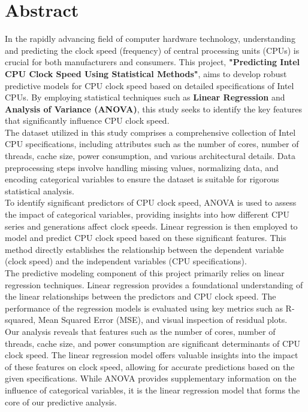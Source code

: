 \section{Abstract}

In the rapidly advancing field of computer hardware technology, understanding and predicting the clock speed (frequency) of central processing units (CPUs) is crucial for both manufacturers and consumers. This project, \textbf{"Predicting Intel CPU Clock Speed Using Statistical Methods"}, aims to develop robust predictive models for CPU clock speed based on detailed specifications of Intel CPUs. By employing statistical techniques such as \textbf{Linear Regression} and \textbf{Analysis of Variance (ANOVA)}, this study seeks to identify the key features that significantly influence CPU clock speed.\\

The dataset utilized in this study comprises a comprehensive collection of Intel CPU specifications, including attributes such as the number of cores, number of threads, cache size, power consumption, and various architectural details. Data preprocessing steps involve handling missing values, normalizing data, and encoding categorical variables to ensure the dataset is suitable for rigorous statistical analysis.\\

To identify significant predictors of CPU clock speed, ANOVA is used to assess the impact of categorical variables, providing insights into how different CPU series and generations affect clock speeds. Linear regression is then employed to model and predict CPU clock speed based on these significant features. This method directly establishes the relationship between the dependent variable (clock speed) and the independent variables (CPU specifications).\\

The predictive modeling component of this project primarily relies on linear regression techniques. Linear regression provides a foundational understanding of the linear relationships between the predictors and CPU clock speed. The performance of the regression models is evaluated using key metrics such as R-squared, Mean Squared Error (MSE), and visual inspection of residual plots.\\

Our analysis reveals that features such as the number of cores, number of threads, cache size, and power consumption are significant determinants of CPU clock speed. The linear regression model offers valuable insights into the impact of these features on clock speed, allowing for accurate predictions based on the given specifications. While ANOVA provides supplementary information on the influence of categorical variables, it is the linear regression model that forms the core of our predictive analysis.\\

